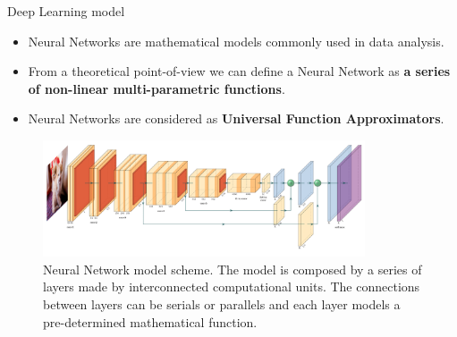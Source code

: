 \documentclass[10pt, unicode]{beamer}
\begin{document}
\begin{frame}{Deep Learning model}

  \begin{itemize}
    \item Neural Networks are mathematical models commonly used in data analysis.
    \item From a theoretical point-of-view we can define a Neural Network as \textbf{a series of non-linear multi-parametric functions}.
    \item Neural Networks are considered as \textbf{Universal Function Approximators}.
  \end{itemize}

  \begin{figure}[hbp]
    \centering
    \includegraphics[width=0.85\textwidth, height=0.29\textwidth]{images/net_scheme.png}
    \caption{\scriptsize{Neural Network model scheme.
             The model is composed by a series of layers made by interconnected computational units.
             The connections between layers can be serials or parallels and each layer models a pre-determined mathematical function.
            }}
  \end{figure}

\end{frame}
\end{document}
